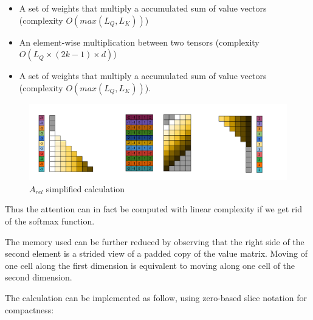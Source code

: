 \begin{itemize}
\item A set of weights that multiply a
accumulated sum of value vectors (complexity $O(max(L_Q, L_K))$)
\item An
element-wise multiplication between two tensors (complexity
$O(L_Q\times (2k-1) \times d)$)
\item A set of weights that multiply a
accumulated sum of value vectors (complexity $O(max(L_Q, L_K))$).
\end{itemize}

\begin{figure}
\centering
\includegraphics[width=0.9\linewidth]{images/S_rel_V_detailed.png}
\caption{$A_{rel}$ simplified calculation}
\end{figure}

Thus the attention can in fact be computed with linear complexity if we
get rid of the softmax function.

The memory used can be further reduced by observing that the right side
of the second element is a strided view of a padded copy of the value
matrix. Moving of one cell along the first dimension is equivalent to
moving along one cell of the second dimension.

The calculation can be implemented as follow, using zero-based slice
notation for compactness:


